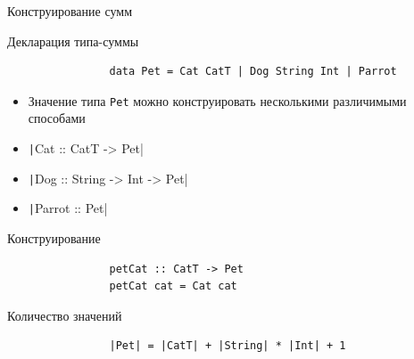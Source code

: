     \begin{frame}[fragile]{Конструирование сумм}
        \begin{block}{Декларация типа-суммы}
            \begin{verbatim}
                data Pet = Cat CatT | Dog String Int | Parrot
            \end{verbatim}
            \pause
            \begin{itemize}
                \item Значение типа \texttt{Pet} можно конструировать несколькими различимыми способами
                \item \texttt|Cat :: CatT -> Pet|
                \item \texttt|Dog :: String -> Int -> Pet|
                \item \texttt|Parrot :: Pet|
            \end{itemize}
        \end{block}
        \begin{block}{Конструирование}
            \begin{verbatim}
                petCat :: CatT -> Pet
                petCat cat = Cat cat
            \end{verbatim}
        \end{block}
        \begin{block}{Количество значений}
            \begin{verbatim}
                |Pet| = |CatT| + |String| * |Int| + 1
            \end{verbatim}
        \end{block}
    \end{frame}

